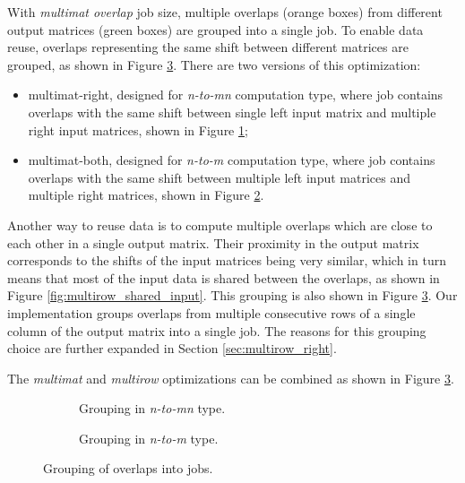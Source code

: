 With \textit{multimat overlap} job size, multiple overlaps (orange boxes) from different output matrices (green boxes) are grouped into a single job. To enable data reuse, overlaps representing the same shift between different matrices are grouped, as shown in Figure \ref{fig:job_size_modifiers}. There are two versions of this optimization:
\begin{itemize}
	\item multimat-right, designed for \textit{n-to-mn} computation type, where job contains overlaps with the same shift between single left input matrix and multiple right input matrices, shown in Figure \ref{fig:job_size_modifiers_n_to_mn};
	\item multimat-both, designed for \textit{n-to-m} computation type, where job contains overlaps with the same shift between multiple left input matrices and multiple right matrices, shown in Figure \ref{fig:job_size_modifiers_n_to_m}.
\end{itemize}

Another way to reuse data is to compute multiple overlaps which are close to each other in a single output matrix. Their proximity in the output matrix corresponds to the shifts of the input matrices being very similar, which in turn means that most of the input data is shared between the overlaps, as shown in Figure \ref{fig:multirow_shared_input}. This grouping is also shown in Figure \ref{fig:job_size_modifiers}. Our implementation groups overlaps from multiple consecutive rows of a single column of the output matrix into a single job. The reasons for this grouping choice are further expanded in Section \ref{sec:multirow_right}.



The \textit{multimat} and \textit{multirow} optimizations can be combined as shown in Figure \ref{fig:job_size_modifiers}.



\begin{figure}
	\centering	
	\begin{subfigure}{0.4\textwidth}
		\centering
		\def\svgwidth{\textwidth}
		\fontsize{8}{10}\selectfont
		
		\caption{Grouping in \textit{n-to-mn} type.}
		\label{fig:job_size_modifiers_n_to_mn}
	\end{subfigure}
	\hfill
	\begin{subfigure}{0.4\textwidth}
		\centering
		\def\svgwidth{\textwidth}
		\fontsize{8}{10}\selectfont
		
		\caption{Grouping in \textit{n-to-m} type.}
		\label{fig:job_size_modifiers_n_to_m}
	\end{subfigure}
	
	\caption{Grouping of overlaps into jobs.}
	\label{fig:job_size_modifiers}
\end{figure}

